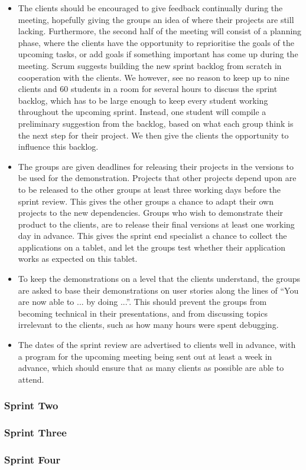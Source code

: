 \begin{itemize}
	\item The clients should be encouraged to give feedback continually during the meeting, hopefully giving the groups an idea of where their projects are still lacking. Furthermore, the second half of the meeting will consist of a planning phase, where the clients have the opportunity to reprioritise the goals of the upcoming tasks, or add goals if something important has come up during the meeting. Scrum suggests building the new 	sprint backlog from scratch in cooperation with the clients. We however, see no reason to keep up to nine clients and 60 students in a room for several hours to discuss the sprint backlog, which has to be large enough to keep every student working throughout the upcoming sprint. Instead, one student will compile a preliminary suggestion from the backlog, based on what each group think is the next step for their project. We then give the clients the opportunity to influence this backlog.
	\item The groups are given deadlines for releasing their projects in the versions to be used for the demonstration. Projects that other projects depend upon are to be released to the other groups at least three working days before the sprint review. This gives the other groups a chance to adapt their own projects to the new dependencies. Groups who wish to demonstrate their product to the clients, are to release their final versions at least one working day in advance. This gives the sprint end specialist a chance to collect the applications on a tablet, and let the groups test whether their application works as expected on this tablet. 
	\item To keep the demonstrations on a level that the clients understand, the groups are asked to base their demonstrations on user stories along the lines of ``You are now able to ... by doing ...''. This should prevent the groups from becoming technical in their presentations, and from discussing topics irrelevant to the clients, such as how many hours were spent debugging. 
	\item The dates of the sprint review are advertised to clients well in advance, with a program for the upcoming meeting being sent out at least a week in advance, which should ensure that as many clients as possible are able to attend. 
\end{itemize}

\subsubsection{Sprint Two}\label{collab:sprintendtwo}


\subsubsection{Sprint Three}


\subsubsection{Sprint Four}

